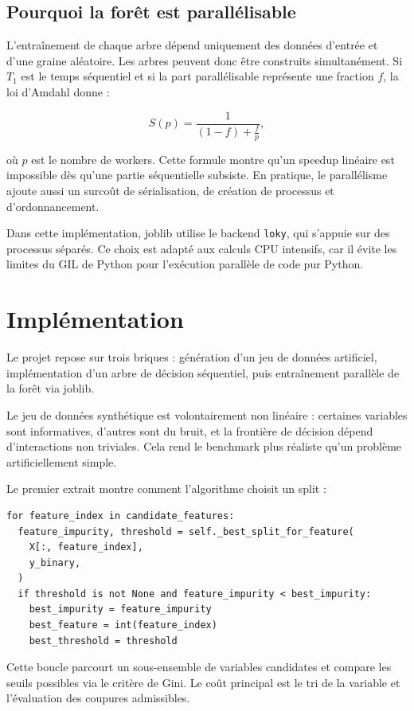 \documentclass[11pt,a4paper]{article}
\begin{document}
\subsection{Pourquoi la forêt est parallélisable}

L'entraînement de chaque arbre dépend uniquement des données d'entrée et d'une graine aléatoire. Les arbres peuvent donc être construits simultanément. Si $T_1$ est le temps séquentiel et si la part parallélisable représente une fraction $f$, la loi d'Amdahl donne :

\[
S(p) = \frac{1}{(1-f) + \frac{f}{p}},
\]

où $p$ est le nombre de workers. Cette formule montre qu'un speedup linéaire est impossible dès qu'une partie séquentielle subsiste. En pratique, le parallélisme ajoute aussi un surcoût de sérialisation, de création de processus et d'ordonnancement.

Dans cette implémentation, joblib utilise le backend \texttt{loky}, qui s'appuie sur des processus séparés. Ce choix est adapté aux calculs CPU intensifs, car il évite les limites du GIL de Python pour l'exécution parallèle de code pur Python.

\section{Implémentation}

Le projet repose sur trois briques : génération d'un jeu de données artificiel, implémentation d'un arbre de décision séquentiel, puis entraînement parallèle de la forêt via joblib.

Le jeu de données synthétique est volontairement non linéaire : certaines variables sont informatives, d'autres sont du bruit, et la frontière de décision dépend d'interactions non triviales. Cela rend le benchmark plus réaliste qu'un problème artificiellement simple.

Le premier extrait montre comment l'algorithme choisit un split :

\begin{lstlisting}[style=pythonstyle]
for feature_index in candidate_features:
  feature_impurity, threshold = self._best_split_for_feature(
    X[:, feature_index],
    y_binary,
  )
  if threshold is not None and feature_impurity < best_impurity:
    best_impurity = feature_impurity
    best_feature = int(feature_index)
    best_threshold = threshold
\end{lstlisting}

Cette boucle parcourt un sous-ensemble de variables candidates et compare les seuils possibles via le critère de Gini. Le coût principal est le tri de la variable et l'évaluation des coupures admissibles.
\end{document}
